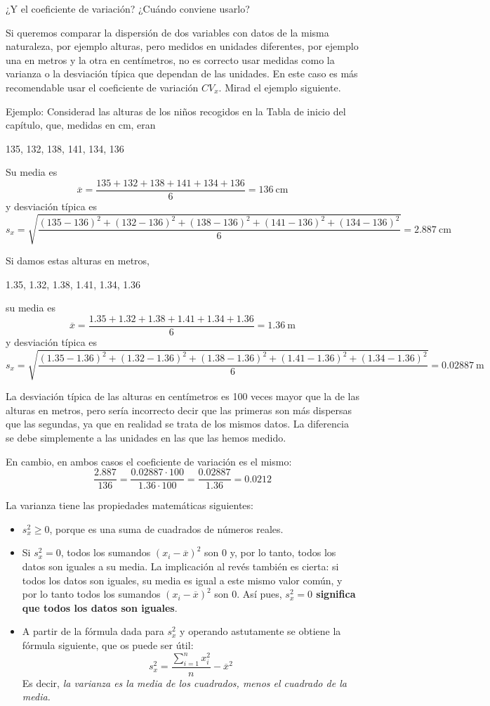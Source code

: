 \documentclass[
  spanish,
  letterpaper,
  DIV=11,
  numbers=noendperiod]{scrreprt}
\begin{document}

¿Y el coeficiente de variación? ¿Cuándo conviene usarlo?

Si queremos comparar la dispersión de dos variables con datos de la
misma naturaleza, por ejemplo alturas, pero medidos en unidades
diferentes, por ejemplo una en metros y la otra en centímetros, no es
correcto usar medidas como la varianza o la desviación típica que
dependan de las unidades. En este caso es más recomendable usar el
coeficiente de variación \(CV_x\). Mirad el ejemplo siguiente.


Ejemplo: Considerad las alturas de los niños recogidos en la Tabla de
inicio del capítulo, que, medidas en cm, eran

135, 132, 138, 141, 134, 136

Su media es \[
\overline{x}=\frac{135+ 132+138+141+134+136}{6}=136\ \text{cm}
\] y desviación típica es \[
s_x=\sqrt{\frac{(135-136)^2+(132-136)^2+(138-136)^2+(141-136)^2+(134-136)^2}{6}}=2.887\ \text{cm}
\]

Si damos estas alturas en metros,

1.35, 1.32, 1.38, 1.41, 1.34, 1.36

su media es \[
\overline{x}=\frac{1.35+ 1.32+1.38+1.41+1.34+1.36}{6}=1.36\ \text{m}
\] y desviación típica es \[
s_x=\sqrt{\frac{(1.35-1.36)^2+(1.32-1.36)^2+(1.38-1.36)^2+(1.41-1.36)^2+(1.34-1.36)^2}{6}}=0.02887\ \text{m}
\]

La desviación típica de las alturas en centímetros es 100 veces mayor
que la de las alturas en metros, pero sería incorrecto decir que las
primeras son más dispersas que las segundas, ya que en realidad se trata
de los mismos datos. La diferencia se debe simplemente a las unidades en
las que las hemos medido.

En cambio, en ambos casos el coeficiente de variación es el mismo: \[
\frac{2.887}{136}=\frac{0.02887\cdot 100}{1.36\cdot 100}=\frac{0.02887}{1.36}=0.0212
\]

La varianza tiene las propiedades matemáticas siguientes:

\begin{itemize}
\item
  \(s_x^2\geqslant 0\), porque es una suma de cuadrados de números
  reales.
\item
  Si \(s_x^2=0\), todos los sumandos \((x_i-\overline{x})^2\) son 0 y,
  por lo tanto, todos los datos son iguales a su media. La implicación
  al revés también es cierta: si todos los datos son iguales, su media
  es igual a este mismo valor común, y por lo tanto todos los sumandos
  \((x_i-\overline{x})^2\) son 0. Así pues, \textbf{\(s_x^2=0\)
  significa que todos los datos son iguales}.
\item
  A partir de la fórmula dada para \(s_x^2\) y operando astutamente se
  obtiene la fórmula siguiente, que os puede ser útil: \[
  s_x^2= \frac{\sum_{i=1}^n x_i^2}{n}-\overline{x}^2
  \] Es decir, \emph{la varianza es la media de los cuadrados, menos el
  cuadrado de la media.}
\end{itemize}
\end{document}
